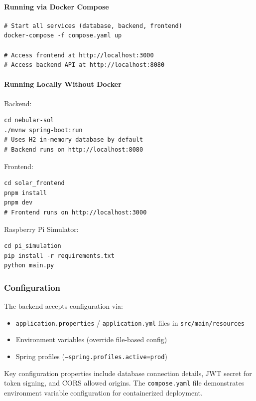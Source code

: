 \paragraph{Running via Docker Compose}
\begin{verbatim}
# Start all services (database, backend, frontend)
docker-compose -f compose.yaml up

# Access frontend at http://localhost:3000
# Access backend API at http://localhost:8080
\end{verbatim}

\paragraph{Running Locally Without Docker}
Backend:
\begin{verbatim}
cd nebular-sol
./mvnw spring-boot:run
# Uses H2 in-memory database by default
# Backend runs on http://localhost:8080
\end{verbatim}

Frontend:
\begin{verbatim}
cd solar_frontend
pnpm install
pnpm dev
# Frontend runs on http://localhost:3000
\end{verbatim}

Raspberry Pi Simulator:
\begin{verbatim}
cd pi_simulation
pip install -r requirements.txt
python main.py
\end{verbatim}

\subsubsection{Configuration}
\label{subsubsec:production-deployment}

The backend accepts configuration via:
\begin{itemize}
    \item \texttt{application.properties} / \texttt{application.yml} files in \texttt{src/main/resources}
    \item Environment variables (override file-based config)
    \item Spring profiles (\texttt{--spring.profiles.active=prod})
\end{itemize}

Key configuration properties include database connection details, JWT secret for token signing, and CORS allowed origins. The \texttt{compose.yaml} file demonstrates environment variable configuration for containerized deployment.

